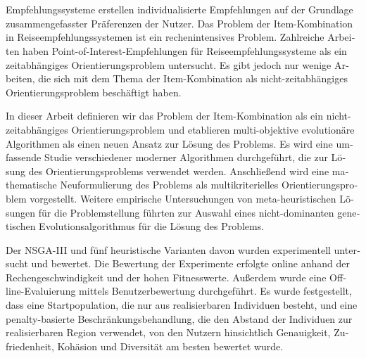 \chapter{\abstractname}
\begin{otherlanguage}{ngerman}
Empfehlungssysteme erstellen individualisierte Empfehlungen auf der Grundlage zusammengefasster Präferenzen der Nutzer. Das Problem der Item-Kombination in Reiseempfehlungssystemen ist ein rechenintensives Problem. Zahlreiche Arbeiten haben Point-of-Interest-Empfehlungen für Reiseempfehlungssysteme als ein zeitabhängiges Orientierungsproblem untersucht. Es gibt jedoch nur wenige Arbeiten, die sich mit dem Thema der Item-Kombination als nicht-zeitabhängiges Orientierungsproblem beschäftigt haben.

In dieser Arbeit definieren wir das Problem der Item-Kombination als ein nicht-zeitabhängiges Orientierungsproblem und etablieren multi-objektive evolutionäre Algorithmen als einen neuen Ansatz zur Lösung des Problems. Es wird eine umfassende Studie verschiedener moderner Algorithmen durchgeführt, die zur Lösung des Orientierungsproblems verwendet werden. Anschließend wird eine mathematische Neuformulierung des Problems als multikriterielles Orientierungsproblem vorgestellt. Weitere empirische Untersuchungen von meta-heuristischen Lösungen für die Problemstellung führten zur Auswahl eines nicht-dominanten genetischen Evolutionsalgorithmus für die Lösung des Problems.

Der NSGA-III und fünf heuristische Varianten davon wurden experimentell untersucht und bewertet. Die Bewertung der Experimente erfolgte online anhand der Rechengeschwindigkeit und der hohen Fitnesswerte. Außerdem wurde eine Offline-Evaluierung mittels Benutzerbewertung durchgeführt. Es wurde festgestellt, dass eine Startpopulation, die nur aus realisierbaren Individuen besteht, und eine penalty-basierte Beschränkungsbehandlung, die den Abstand der Individuen zur realisierbaren Region verwendet, von den Nutzern hinsichtlich Genauigkeit, Zufriedenheit, Kohäsion und Diversität am besten bewertet wurde.  

\end{otherlanguage}


\makeatletter
{}
{\renewcommand{\abstractname}{Abstract}}
{\renewcommand{\abstractname}{Kurzfassung}}
\makeatother